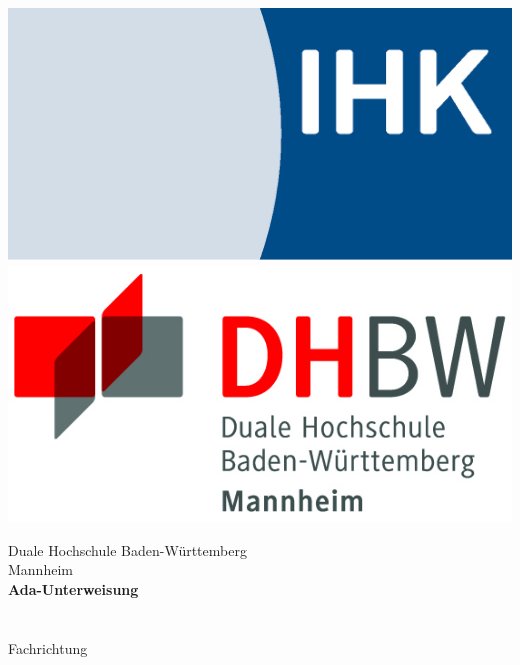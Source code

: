 \begin{titlepage}
\begin{minipage}{\textwidth}
		\vspace{-2cm}
		\noindent \includegraphics[scale=0.25]{img/ihk.eps} \hfill   \includegraphics[scale=0.79]{img/logo.jpg}
\end{minipage}
\vspace{1em}
\sffamily
\begin{center}
	\textsf{\large{}Duale Hochschule Baden-W\"urttemberg\\[1.5mm] Mannheim}\\[2em]
	\textsf{\textbf{\Large{}Ada-Unterweisung }}\\[3mm]
	\textsf{\textbf{\DerTitelDerArbeit}} \\[1.5cm]
	\textsf{\textbf{\Large{}\DieBerufsausbildung}\\[3mm] 
	\textsf{Fachrichtung \DieFachrichtungDerAusbildung}}
	
	\vspace{3em}
\vfill

\begin{minipage}{\textwidth}


\end{minipage}
\end{center}
\end{titlepage}
